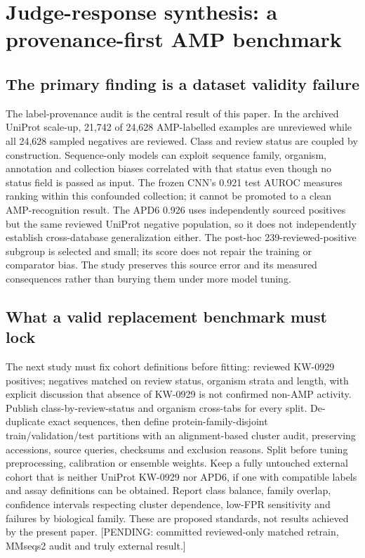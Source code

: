 \clearpage
\section*{Judge-response synthesis: a provenance-first AMP benchmark}
\subsection*{The primary finding is a dataset validity failure}
The label-provenance audit is the central result of this paper. In the archived UniProt scale-up, 21,742 of 24,628 AMP-labelled examples are unreviewed while all 24,628 sampled negatives are reviewed. Class and review status are coupled by construction. Sequence-only models can exploit sequence family, organism, annotation and collection biases correlated with that status even though no status field is passed as input. The frozen CNN's 0.921 test AUROC measures ranking within this confounded collection; it cannot be promoted to a clean AMP-recognition result. The APD6 0.926 uses independently sourced positives but the same reviewed UniProt negative population, so it does not independently establish cross-database generalization either. The post-hoc 239-reviewed-positive subgroup is selected and small; its score does not repair the training or comparator bias. The study preserves this source error and its measured consequences rather than burying them under more model tuning.

\subsection*{What a valid replacement benchmark must lock}
The next study must fix cohort definitions before fitting: reviewed KW-0929 positives; negatives matched on review status, organism strata and length, with explicit discussion that absence of KW-0929 is not confirmed non-AMP activity. Publish class-by-review-status and organism cross-tabs for every split. De-duplicate exact sequences, then define protein-family-disjoint train/validation/test partitions with an alignment-based cluster audit, preserving accessions, source queries, checksums and exclusion reasons. Split before tuning preprocessing, calibration or ensemble weights. Keep a fully untouched external cohort that is neither UniProt KW-0929 nor APD6, if one with compatible labels and assay definitions can be obtained. Report class balance, family overlap, confidence intervals respecting cluster dependence, low-FPR sensitivity and failures by biological family. These are proposed standards, not results achieved by the present paper. [PENDING: committed reviewed-only matched retrain, MMseqs2 audit and truly external result.]

